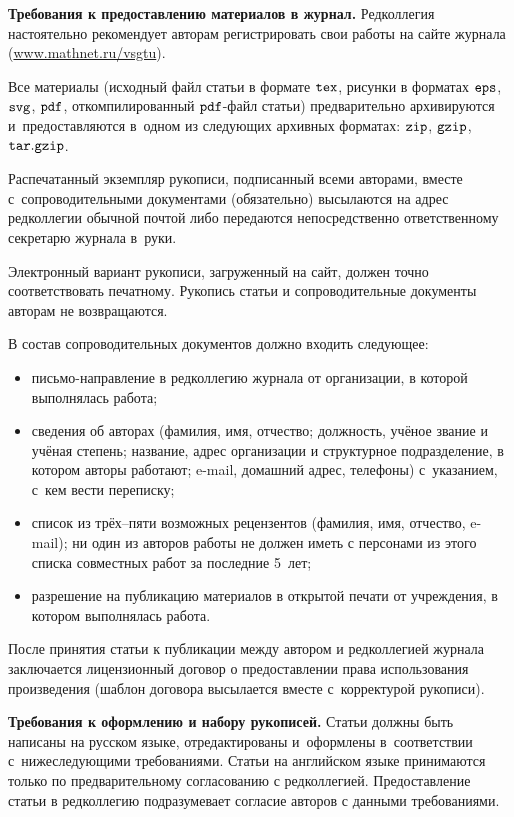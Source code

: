 \smallskip


\textbf{Требования к предоставлению материалов в журнал.} Редколлегия настоятельно рекомендует авторам регистрировать свои работы на сайте журнала (\href{http://www.mathnet.ru/php/esubmission.phtml?jrnid=vsgtu&wshow=snote&option_lang=rus}{www.mathnet.ru/vsgtu}). 

Все материалы (исходный файл статьи в формате $\tt tex$, рисунки в форматах $\tt eps$, $\tt svg$, $\tt pdf$, откомпилированный $\tt pdf$-файл статьи) предварительно архивируются и~предоставляются в~одном из следующих архивных форматах: $\tt zip$, $\tt gzip$, $\tt tar.gzip$. 

Распечатанный экземпляр рукописи, подписанный всеми авторами, вместе с~сопроводительными документами (обязательно) высылаются на адрес редколлегии обычной почтой либо передаются непосредственно ответственному секретарю журнала в~руки. 

Электронный вариант рукописи, загруженный на сайт, должен точно соответствовать печатному. 
Рукопись статьи и сопроводительные документы авторам не возвращаются.


В состав сопроводительных документов должно входить следующее:
\begin{itemize}
\item письмо-направление в редколлегию журнала от организации, в которой выполнялась работа;
\item сведения об авторах (фамилия, имя, отчество; должность, учёное звание и учёная степень; 
название, адрес организации и структурное подразделение, в котором авторы работают; e-mail, домашний адрес, телефоны) с~указанием,  с~кем вести переписку;
\item список из трёх--пяти возможных рецензентов (фамилия, имя, отчество, e-mail); ни один из авторов работы не должен иметь с персонами из этого списка совместных работ за последние 5~лет;
\item разрешение на публикацию материалов в открытой печати от учреждения, в котором выполнялась работа.
\end{itemize}


После принятия статьи к публикации между автором и редколлегией журнала заключается лицензионный договор о предоставлении права использования произведения (шаблон договора высылается вместе с~корректурой рукописи).



\smallskip

\textbf{Требования к оформлению и набору рукописей.} 
Статьи должны быть написаны на русском языке, отредактированы и~оформлены в~соответствии с~нижеследующими требованиями. Статьи на английском языке принимаются только по предварительному согласованию с редколлегией.
Предоставление статьи в редколлегию подразумевает согласие  авторов с данными требованиями.

